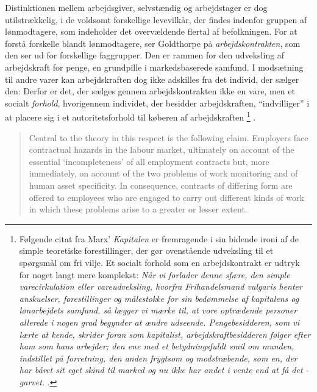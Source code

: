 Distinktionen mellem arbejdsgiver, selvstændig og arbejdstager er dog utilstrækkelig, i de voldsomt forskellige levevilkår, der findes indenfor gruppen af lønmodtagere, som indeholder det overvældende flertal af befolkningen. 
For at forstå forskelle blandt lønmodtagere, ser Goldthorpe på \emph{arbejdskontrakten}, som den ser ud for forskellige faggrupper. Den er rammen for den udveksling af arbejdskraft for penge, en grundpille i markedsbaserede samfund. I modsætning til andre varer kan arbejdskraften dog ikke adskilles fra det individ, der sælger den: Derfor er det, der sælges gennem arbejdskontrakten ikke en vare, men et socialt \emph{forhold}, hvorigennem individet, der besidder arbejdskraften, “indvilliger” i at placere sig i et autoritetsforhold til køberen af arbejdskraften%
%
\footnote{ Følgende citat fra Marx' \emph{Kapitalen} er fremragende i sin bidende ironi af de simple teoretiske forestillinger, der gør ovenstående udveksling til et spørgsmål om fri vilje. Et socialt forhold som en arbejdskontrakt er udtryk for noget langt mere komplekst:  \emph{Når vi forlader denne sfære, den simple varecirkulation eller vareudveksling, hvorfra Frihandelsmand vulgaris henter anskuelser, forestillinger og målestokke for sin bedømmelse af kapitalens og lønarbejdets samfund, så lægger vi mærke til, at vore optrædende personer allerede i nogen grad begynder at ændre udseende. Pengebesidderen, som vi lærte at kende, skrider foran som kapitalist, arbejdskraftbesidderen følger efter ham som hans arbejder; den ene med et betydningsfuldt smil om munden, indstillet på forretning, den anden frygtsom og modstræbende, som en, der har båret sit eget skind til marked og nu ikke har andet i vente end at få det - garvet.} \parencite[293]{Marx1970}.}%
%
. 

%
\begin{quote} \small %
Central to the theory in this respect is the following claim. Employers face contractual hazards in the labour market, ultimately on account of the essential ‘incompleteness’ of all employment contracts but, more immediately, on account of the two problems of work monitoring and of human asset specificity. In consequence, contracts of differing form are offered to employees who are engaged to carry out different kinds of work in which these problems arise to a greater or lesser extent.  
\end{quote}
%

